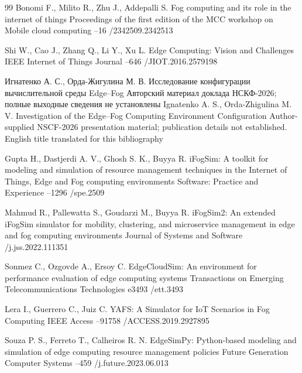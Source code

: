 \begin{thebibliography}{99}
\by Bonomi F., Milito R., Zhu J., Addepalli S.
\paper Fog computing and its role in the internet of things
\inbook Proceedings of the first edition of the MCC workshop on Mobile cloud computing
--16
/2342509.2342513

\by Shi W., Cao J., Zhang Q., Li Y., Xu L.
\paper Edge Computing: Vision and Challenges
\jour IEEE Internet of Things Journal
--646
/JIOT.2016.2579198

\by Игнатенко А. С., Орда-Жигулина М. В.
\paper Исследование конфигурации вычислительной среды Edge--Fog
\inbook Авторский материал доклада НСКФ-2026; полные выходные сведения не установлены
\transl
\by Ignatenko A. S., Orda-Zhigulina M. V.
\paper Investigation of the Edge--Fog Computing Environment Configuration
\inbook Author-supplied NSCF-2026 presentation material; publication details not established. English title translated for this bibliography

\by Gupta H., Dastjerdi A. V., Ghosh S. K., Buyya R.
\paper iFogSim: A toolkit for modeling and simulation of resource management techniques in the Internet of Things, Edge and Fog computing environments
\jour Software: Practice and Experience
--1296
/spe.2509

\by Mahmud R., Pallewatta S., Goudarzi M., Buyya R.
\paper iFogSim2: An extended iFogSim simulator for mobility, clustering, and microservice management in edge and fog computing environments
\jour Journal of Systems and Software
/j.jss.2022.111351

\by Sonmez C., Ozgovde A., Ersoy C.
\paper EdgeCloudSim: An environment for performance evaluation of edge computing systems
\jour Transactions on Emerging Telecommunications Technologies
\pages e3493
/ett.3493

\by Lera I., Guerrero C., Juiz C.
\paper YAFS: A Simulator for IoT Scenarios in Fog Computing
\jour IEEE Access
--91758
/ACCESS.2019.2927895

\by Souza P. S., Ferreto T., Calheiros R. N.
\paper EdgeSimPy: Python-based modeling and simulation of edge computing resource management policies
\jour Future Generation Computer Systems
--459
/j.future.2023.06.013


\end{thebibliography}
